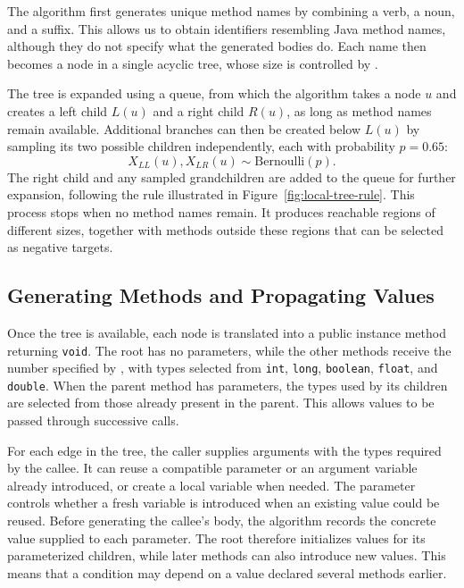 The algorithm first generates unique method names by combining a verb, a noun, and a suffix. This allows us to obtain identifiers resembling Java method names, although they do not specify what the generated bodies do. Each name then becomes a node in a single acyclic tree, whose size is controlled by .

The tree is expanded using a queue, from which the algorithm takes a node $u$ and creates a left child $L(u)$ and a right child $R(u)$, as long as method names remain available. Additional branches can then be created below $L(u)$ by sampling its two possible children independently, each with probability $p=0.65$:
\[
    X_{LL}(u),X_{LR}(u)\sim\mathrm{Bernoulli}(p).
\]
The right child and any sampled grandchildren are added to the queue for further expansion, following the rule illustrated in Figure~\ref{fig:local-tree-rule}. This process stops when no method names remain. It produces reachable regions of different sizes, together with methods outside these regions that can be selected as negative targets.



\subsection{Generating Methods and Propagating Values}

Once the tree is available, each node is translated into a public instance method returning \texttt{void}. The root has no parameters, while the other methods receive the number specified by , with types selected from \texttt{int}, \texttt{long}, \texttt{boolean}, \texttt{float}, and \texttt{double}. When the parent method has parameters, the types used by its children are selected from those already present in the parent. This allows values to be passed through successive calls.

For each edge in the tree, the caller supplies arguments with the types required by the callee. It can reuse a compatible parameter or an argument variable already introduced, or create a local variable when needed. The parameter  controls whether a fresh variable is introduced when an existing value could be reused. Before generating the callee's body, the algorithm records the concrete value supplied to each parameter. The root therefore initializes values for its parameterized children, while later methods can also introduce new values. This means that a condition may depend on a value declared several methods earlier.

